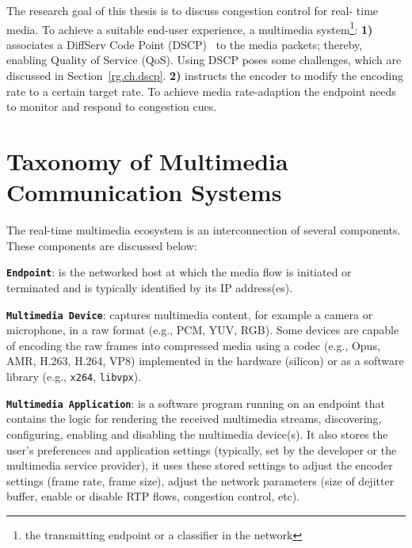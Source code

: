 
The research goal of this thesis is to discuss congestion control for real-
time media. To achieve a suitable end-user experience, a multimedia
system\footnote{the transmitting endpoint or a classifier in the network}:
\textbf{1)} associates a DiffServ Code Point (DSCP)~\cite{rfc2474} to the
media packets; thereby, enabling Quality of Service (QoS). Using DSCP poses
some challenges, which are discussed in Section~\ref{rg.ch.dscp}. \textbf{2)}
instructs the encoder to modify the encoding rate to a certain target rate. To
achieve media rate-adaption the endpoint needs to monitor and respond to
congestion cues.



\section{Taxonomy of Multimedia Communication Systems}

The real-time multimedia ecosystem is an interconnection of several
components. These components are discussed below:

\textbf{\texttt{Endpoint}}: is the networked host at which the media flow is
initiated or terminated and is typically identified by its IP address(es).


\textbf{\texttt{Multimedia Device}}: captures multimedia content, for example
a camera or microphone, in a raw format (e.g., PCM, YUV, RGB). Some devices
are capable of encoding the raw frames into compressed media using a codec
(e.g., Opus, AMR, H.263, H.264, VP8) implemented in the hardware (silicon) or
as a software library (e.g., \texttt{x264}, \texttt{libvpx}).


\textbf{\texttt{Multimedia Application}}: is a software program running on an
endpoint that contains the logic for rendering the received multimedia
streams, discovering, configuring, enabling and disabling the multimedia
device(s). It also stores the user's preferences and application settings
(typically, set by the developer or the multimedia service provider), it uses
these stored settings to adjust the encoder settings (frame rate, frame size),
adjust the network parameters (size of dejitter buffer, enable or disable RTP
flows, congestion control, etc).

